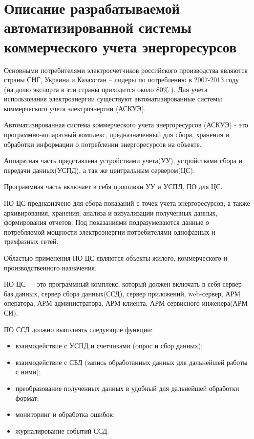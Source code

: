 \newpage
\section{Описание разрабатываемой автоматизированной системы коммерческого учета энергоресурсов}
\setcounter{figure}{0}

Основными  потребителями  электросчетчиков российского производства являются страны СНГ, Украина и Казахстан – лидеры по потреблению в 2007-2013 году (на долю экспорта в эти страны приходится около  80\% \cite{rbk} ). Для учета использования электроэнергии существуют автоматизированные системы коммерческого учета электроэнергии (АСКУЭ).

Автоматизированная система коммерческого учета энергоресурсов (АСКУЭ) - это программно-аппаратный комплекс, предназначенный для сбора, хранения и обработки информации о потреблении энергоресурсов на объекте. 

Аппаратная часть представлена устройствами учета(УУ), устройствами сбора и передачи данных(УСПД), а так же центральным сервером(ЦС).

Программная часть включает в себя прошивки УУ и УСПД, ПО для ЦС.

ПО ЦС предназначено для сбора показаний с точек учета энергоресурсов, а также архивирования, хранения, анализа и визуализации полученных данных, формирования отчетов. Под показаниями подразумеваются данные о потребляемой мощности электроэнергии потребителями однофазных и трехфазных сетей.

Областью применения ПО ЦС являются объекты жилого, коммерческого и производственного назначения.

ПО ЦС — это программный комплекс, который должен включать в себя сервер баз данных, сервер сбора данных(ССД), сервер приложений, web-сервер, АРМ оператора, АРМ администратора, АРМ клиента, АРМ сервисного инженера(АРМ СИ).

ПО ССД должно выполнять следующие функции:
\begin{itemize}
 \item взаимодействие с УСПД и счетчиками (опрос и сбор данных);
 \item взаимодействие с СБД (запись обработанных данных для дальнейшей работы с ними);
 \item преобразование полученных данных в удобный для дальнейшей обработки формат;
 \item мониторинг и обработка ошибок;
 \item журналирование событий ССД.
\end{itemize}

